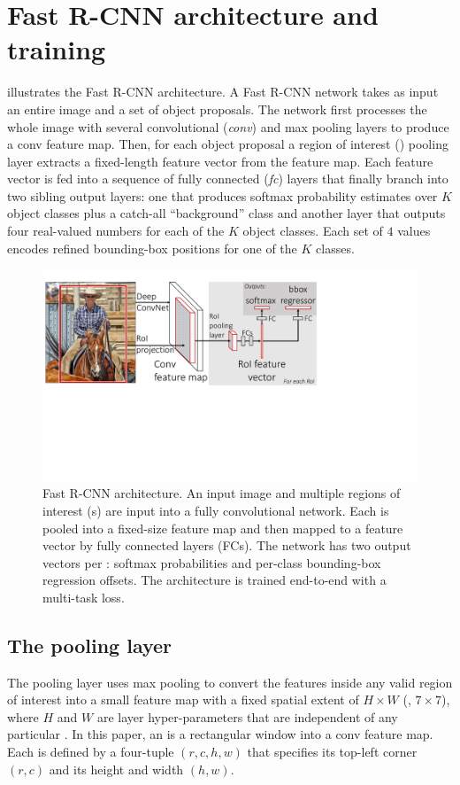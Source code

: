 \section{Fast R-CNN architecture and training}

 illustrates the Fast R-CNN architecture.
A Fast R-CNN network takes as input an entire image and a set of object proposals.
The network first processes the whole image with several convolutional (\emph{conv}) and max pooling layers to produce a conv feature map.
Then, for each object proposal a region of interest (\emph{\roi}) pooling layer extracts a fixed-length feature vector from the feature map.
Each feature vector is fed into a sequence of fully connected (\emph{fc}) layers that finally branch into two sibling output layers: one that produces softmax probability estimates over $K$ object classes plus a catch-all ``background'' class and another layer that outputs four real-valued numbers for each of the $K$ object classes.
Each set of $4$ values encodes refined bounding-box positions for one of the $K$ classes.

\begin{figure}[t!]
\centering
\includegraphics[width=1\linewidth,trim=0 24em 25em 0, clip]{figs/arch.pdf}
\caption{Fast R-CNN architecture. An input image and multiple regions of interest ({\roi}s) are input into a fully convolutional network. Each \roi is pooled into a fixed-size feature map and then mapped to a feature vector by fully connected layers (FCs). The network has two output vectors per \roi: softmax probabilities and per-class bounding-box regression offsets. The architecture is trained end-to-end with a multi-task loss.}
\end{figure}


\subsection{The \roi pooling layer}
The \roi pooling layer uses max pooling to convert the features inside any valid region of interest into a small feature map with a fixed spatial extent of $H \times W$ (\eg, $7 \times 7$), where $H$ and $W$ are layer hyper-parameters that are independent of any particular \roi.
In this paper, an \roi is a rectangular window into a conv feature map.
Each \roi is defined by a four-tuple $(r, c, h, w)$ that specifies its top-left corner $(r, c)$ and its height and width $(h, w)$.

